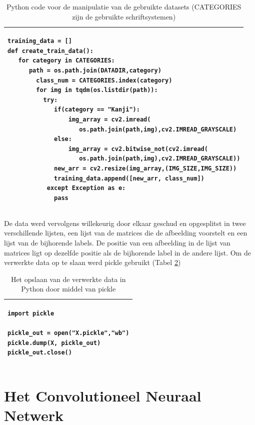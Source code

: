 \begin{table}[!htbp]
    \begin{tabular}{|l|}
        \hline
        \begin{lstlisting}
training_data = []
def create_train_data():
   for category in CATEGORIES: 
      path = os.path.join(DATADIR,category) 
        class_num = CATEGORIES.index(category)
        for img in tqdm(os.listdir(path)): 
          try:
             if(category == "Kanji"):
                 img_array = cv2.imread(
                    os.path.join(path,img),cv2.IMREAD_GRAYSCALE) 
             else:
                 img_array = cv2.bitwise_not(cv2.imread(
                    os.path.join(path,img),cv2.IMREAD_GRAYSCALE))
             new_arr = cv2.resize(img_array,(IMG_SIZE,IMG_SIZE))
             training_data.append([new_arr, class_num])
           except Exception as e:
             pass
        \end{lstlisting}
        \\ \hline
    \end{tabular}
    \caption{Python code voor de manipulatie van de gebruikte datasets (CATEGORIES zijn de gebruikte schriftsystemen) }\label{table:DataManipulation}
\end{table}

De data werd vervolgens willekeurig door elkaar geschud en opgesplitst in twee verschillende lijsten, een lijst van de matrices die de afbeelding voorstelt en een lijst van de bijhorende labels. De positie van een afbeelding in de lijst van matrices ligt op dezelfde positie als de bijhorende label in de andere lijst.
Om de verwerkte data op te slaan werd pickle gebruikt (Tabel \ref{table:DataSave})


\begin{table}[!htbp]
    \begin{tabular}{|l|}
        \hline
        \begin{lstlisting}
import pickle
       
pickle_out = open("X.pickle","wb")
pickle.dump(X, pickle_out)
pickle_out.close()
        \end{lstlisting}
        \\ \hline
    \end{tabular}
    \caption{Het opslaan van de verwerkte data in Python door middel van pickle }\label{table:DataSave}
\end{table}



\section{Het Convolutioneel Neuraal Netwerk}

